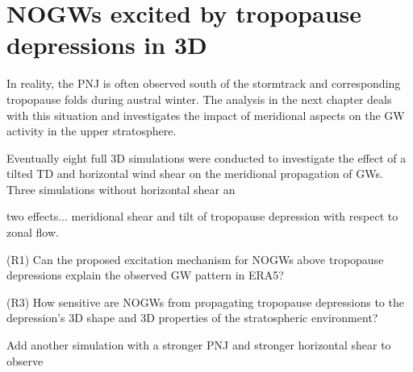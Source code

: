 \chapter{NOGWs excited by tropopause depressions in 3D}
\label{sec:results3D}
In reality, the PNJ is often observed south of the stormtrack and corresponding tropopause folds during austral winter. The analysis in the next chapter deals with this situation and investigates the impact of meridional aspects on the GW activity in the upper stratosphere.  

Eventually eight full 3D simulations were conducted to investigate the effect of a tilted TD and horizontal wind shear on the meridional propagation of GWs.
Three simulations without horizontal shear an

two effects... meridional shear and tilt of tropopause depression with respect to zonal flow.

\begin{tcolorbox}[]
    (R1) Can the proposed excitation mechanism for NOGWs above tropopause depressions explain the observed GW pattern in ERA5?
\end{tcolorbox}

\begin{tcolorbox}[]
    (R3) How sensitive are NOGWs from propagating tropopause depressions to the depression's 3D shape and 3D properties of the stratospheric environment?
\end{tcolorbox}

Add another simulation with a stronger PNJ and stronger horizontal shear to observe 


